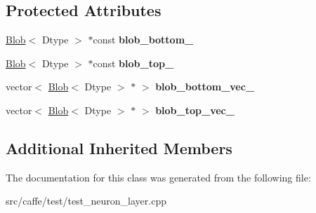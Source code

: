 \subsection*{Protected Attributes}
\begin{DoxyCompactItemize}
\item 
\mbox{\label{classcaffe_1_1_neuron_layer_test_ad170991bc5bf0b0d3969d7511e98bfe0}} 
\mbox{\hyperlink{classcaffe_1_1_blob}{Blob}}$<$ Dtype $>$ $\ast$const {\bfseries blob\+\_\+bottom\+\_\+}
\item 
\mbox{\label{classcaffe_1_1_neuron_layer_test_a76ed5d876b62541edb40143526e015d3}} 
\mbox{\hyperlink{classcaffe_1_1_blob}{Blob}}$<$ Dtype $>$ $\ast$const {\bfseries blob\+\_\+top\+\_\+}
\item 
\mbox{\label{classcaffe_1_1_neuron_layer_test_abc5f610fc19445ff54977203994d8e48}} 
vector$<$ \mbox{\hyperlink{classcaffe_1_1_blob}{Blob}}$<$ Dtype $>$ $\ast$ $>$ {\bfseries blob\+\_\+bottom\+\_\+vec\+\_\+}
\item 
\mbox{\label{classcaffe_1_1_neuron_layer_test_a777d5787399df46ddb3eb4aa890072e6}} 
vector$<$ \mbox{\hyperlink{classcaffe_1_1_blob}{Blob}}$<$ Dtype $>$ $\ast$ $>$ {\bfseries blob\+\_\+top\+\_\+vec\+\_\+}
\end{DoxyCompactItemize}
\subsection*{Additional Inherited Members}


The documentation for this class was generated from the following file\+:\begin{DoxyCompactItemize}
\item 
src/caffe/test/test\+\_\+neuron\+\_\+layer.\+cpp\end{DoxyCompactItemize}
